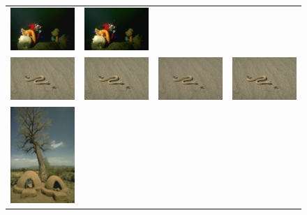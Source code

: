 \documentclass[10pt,twocolumn,letterpaper]{article}
\begin{document}
\begin{figure}[h!]
\begin{tabular}{cccc}
\includegraphics[width=1.5in]{images/used/appendix/jpg/BSD100/45096_SRGAN-VGG54} &
\includegraphics[width=1.5in]{images/used/appendix/jpg/BSD100/45096_HR} \\
\includegraphics[width=1.5in]{images/used/appendix/jpg/BSD100/196073_bicubic}&
\includegraphics[width=1.5in]{images/used/appendix/jpg/BSD100/196073_SRResNet-MSE} &
\includegraphics[width=1.5in]{images/used/appendix/jpg/BSD100/196073_SRGAN-VGG54} &
\includegraphics[width=1.5in]{images/used/appendix/jpg/BSD100/196073_HR} \\
\includegraphics[width=1.5in]{images/used/appendix/jpg/BSD100/54082_bicubic}&

\end{tabular}
\end{figure}
\end{document}
